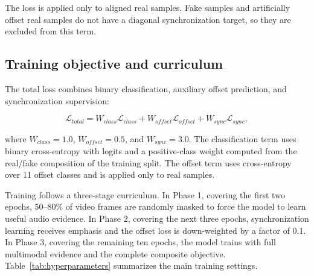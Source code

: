 \documentclass[preprint,12pt,number]{elsarticle}
\begin{document}
The loss is applied only to aligned real samples. Fake samples and artificially offset real samples do not have a diagonal synchronization target, so they are excluded from this term.

\subsection{Training objective and curriculum}
\label{subsec:training}

The total loss combines binary classification, auxiliary offset prediction, and synchronization supervision:

\begin{equation}
\mathcal{L}_{total}
= W_{class}\mathcal{L}_{class}
+ W_{offset}\mathcal{L}_{offset}
+ W_{sync}\mathcal{L}_{sync},
\label{eq:total}
\end{equation}

where $W_{class}=1.0$, $W_{offset}=0.5$, and $W_{sync}=3.0$. The classification term uses binary cross-entropy with logits and a positive-class weight computed from the real/fake composition of the training split. The offset term uses cross-entropy over 11 offset classes and is applied only to real samples.

Training follows a three-stage curriculum. In Phase 1, covering the first two epochs, 50--80\% of video frames are randomly masked to force the model to learn useful audio evidence. In Phase 2, covering the next three epochs, synchronization learning receives emphasis and the offset loss is down-weighted by a factor of 0.1. In Phase 3, covering the remaining ten epochs, the model trains with full multimodal evidence and the complete composite objective. Table~\ref{tab:hyperparameters} summarizes the main training settings.
\end{document}
